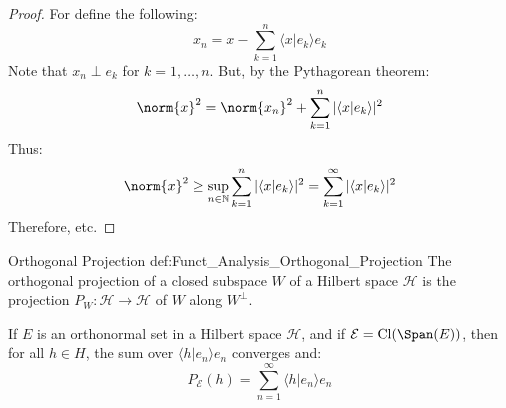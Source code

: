 \documentclass[crop=false,class=book,oneside]{standalone}                      %
\begin{document}
        \begin{proof}
            For define the following:
            \begin{equation}
                x_{n}=x-\sum_{k=1}^{n}
                    \langle{x|e_{k}}\rangle{e}_{k}
            \end{equation}
            Note that $x_{n}\perp{e}_{k}$ for $k=1,\dots,n$.
            But, by the Pythagorean theorem:
            \begin{equation}
                \norm{x}^{2}=\norm{x_{n}}^{2}+
                    \sum_{k=1}^{n}|\langle{x|e_{k}}\rangle|^{2}
            \end{equation}
            Thus:
            \begin{equation}
                \norm{x}^{2}\geq\underset{n\in\mathbb{N}}{\sup}
                    \sum_{k=1}^{n}|\langle{x|e_{k}}\rangle|^{2}
                    =\sum_{k=1}^{\infty}|\langle{x|e_{k}}\rangle|^{2}
            \end{equation}
            Therefore, etc.
        \end{proof}
        \begin{ldefinition}{Orthogonal Projection}
              {def:Funct_Analysis_Orthogonal_Projection}
            The orthogonal projection of a closed subspace $W$
            of a Hilbert space $\mathcal{H}$ is the projection
            $P_{W}:\mathcal{H}\rightarrow\mathcal{H}$ of
            $W$ along $W^{\perp}$.
        \end{ldefinition}
        \begin{theorem}
            If $E$ is an orthonormal set in a Hilbert space
            $\mathcal{H}$, and if
            $\mathcal{E}=\mathrm{Cl}(\Span(E))$, then for all
            $h\in{H}$, the sum over
            $\langle{h|e_{n}}\rangle{e}_{n}$ converges and:
            \begin{equation}
                P_{\mathcal{E}}(h)=\sum_{n=1}^{\infty}
                    \langle{h|e_{n}}\rangle{e}_{n}
            \end{equation}
        \end{theorem}
\end{document}

